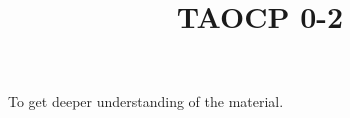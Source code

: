 \documentclass{article}
\title{TAOCP 0\mbox{-}2}
\begin{document}
\maketitle

To get deeper understanding of the material.
\end{document}
